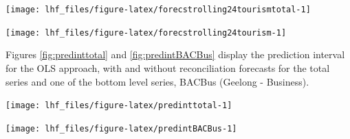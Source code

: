 \documentclass[11pt,a4paper,]{article}
\let\origfigure\figure
\let\endorigfigure\endfigure
\renewenvironment{figure}[1][2] {
    \expandafter\origfigure\expandafter[!htbp]
} {
    \endorigfigure
}
\begin{document}
\begin{figure}

{\centering \texttt{[image: lhf\_files/figure-latex/forecstrolling24tourismtotal-1]} 

}

\caption{The actual test set for the 'Total series' compared to the forecasts from reconciled and unreconciled ETS, ARIMA and OLS methods for rolling and fixed origin tourism demand.}\label{fig:forecstrolling24tourismtotal}
\end{figure}

\begin{figure}

{\centering \texttt{[image: lhf\_files/figure-latex/forecstrolling24tourism-1]} 

}

\caption{The actual test set for the 'BACBus' bottom level series compared to the forecasts from reconciled and unreconciled ETS, ARIMA and OLS methods for rolling and fixed origin tourism demand.}\label{fig:forecstrolling24tourism}
\end{figure}

Figures \ref{fig:predinttotal} and \ref{fig:predintBACBus} display the prediction interval for the OLS approach, with and without reconciliation forecasts for the total series and one of the bottom level series, BACBus (Geelong - Business).

\begin{figure}

{\centering \texttt{[image: lhf\_files/figure-latex/predinttotal-1]} 

}

\caption{The actual test set for the 'Total series' compared to the forecasts from reconciled and unreconciled OLS methods with prediction interval for rolling and fixed origin tourism demand.}\label{fig:predinttotal}
\end{figure}

\begin{figure}

{\centering \texttt{[image: lhf\_files/figure-latex/predintBACBus-1]} 

}

\caption{The actual test set for the 'BACBus' bottom level series compared to the forecasts from reconciled and unreconciled OLS methods with prediction interval for rolling and fixed origin tourism demand.}\label{fig:predintBACBus}
\end{figure}
\end{document}
